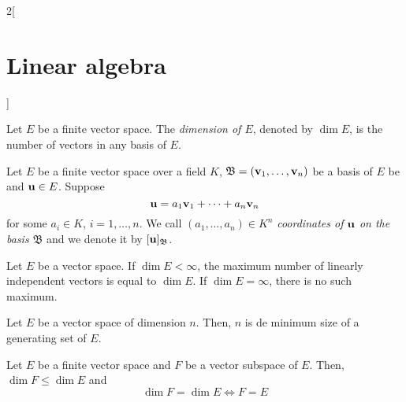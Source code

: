 \documentclass[../../../main.tex]{subfiles}
\begin{document}
\begin{multicols}{2}[\section{Linear algebra}]
\begin{definition}
    Let $E$ be a finite vector space. The \textit{dimension of $E$}, denoted by $\dim E$, is the number of vectors in any basis of $E$.
\end{definition}
\begin{definition}
    Let $E$ be a finite vector space over a field $K$, $\mathfrak{B}=(\vb{v}_1,\ldots,\vb{v}_n)$ be a basis of $E$ be and $\vb{u}\in E$. Suppose $$\vb{u}=a_1\vb{v}_1+\cdots+a_n\vb{v}_n$$ for some $a_i\in K$, $i=1,\ldots,n$. We call $(a_1,\ldots,a_n)\in K^n$ \textit{coordinates of $\vb{u}$ on the basis $\mathfrak{B}$} and we denote it by $[\vb{u}]_{\mathfrak{B}}$.
\end{definition}
\begin{prop}
    Let $E$ be a vector space. If $\dim E<\infty$, the maximum number of linearly independent vectors is equal to $\dim E$. If $\dim E=\infty$, there is no such maximum.
\end{prop}
\begin{prop}
    Let $E$ be a vector space of dimension $n$. Then, $n$ is de minimum size of a generating set of $E$.
\end{prop}
\begin{prop}
    Let $E$ be a finite vector space and $F$ be a vector subspace of $E$. Then, $\dim F\leq\dim E$ and $$\dim F=\dim E\iff F=E$$
\end{prop}

\end{multicols}
\end{document}
